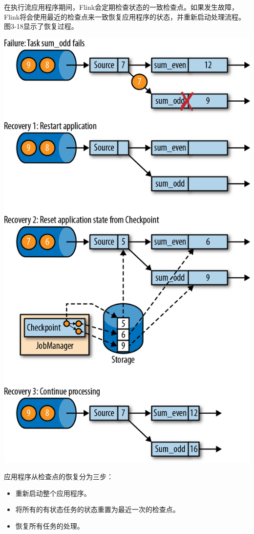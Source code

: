 \documentclass[cn,11pt,chinese]{elegantbook}
\providecommand{\tightlist}{%
  \setlength{\itemsep}{0pt}\setlength{\parskip}{0pt}}
\begin{document}
在执行流应用程序期间，Flink会定期检查状态的一致检查点。如果发生故障，Flink将会使用最近的检查点来一致恢复应用程序的状态，并重新启动处理流程。图3-18显示了恢复过程。

\includegraphics{images/spaf_0318.png}

应用程序从检查点的恢复分为三步：

\begin{itemize}
\tightlist
\item
  重新启动整个应用程序。
\item
  将所有的有状态任务的状态重置为最近一次的检查点。
\item
  恢复所有任务的处理。
\end{itemize}
\end{document}
